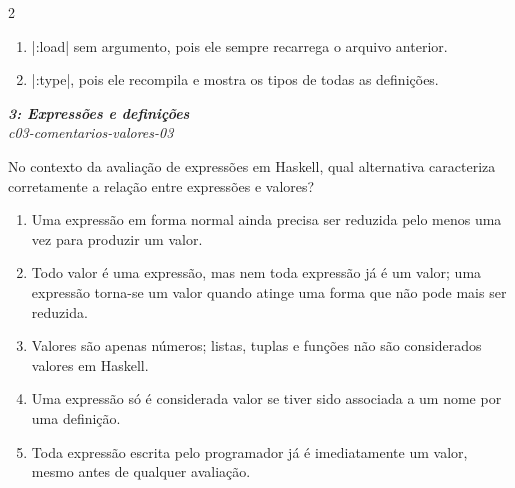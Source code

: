 \documentclass[a4paper,10pt,brazil]{article}
\begin{document}
\begin{multicols}{2}
\begin{enumerate}
  \item \haskellinline|:load| sem argumento, pois ele sempre recarrega o arquivo anterior.

  \item \haskellinline|:type|, pois ele recompila e mostra os tipos de todas as definições.


\end{enumerate}

\begin{flushright}
  \footnotesize
  \textit{\textbf{3: Expressões e definições}}\\
  \textit{c03-comentarios-valores-03}\\

\end{flushright}
No contexto da avaliação de expressões em Haskell, qual alternativa caracteriza corretamente a relação entre expressões e valores?

\begin{enumerate}
  \item Uma expressão em forma normal ainda precisa ser reduzida pelo menos uma vez para produzir um valor.

  \item Todo valor é uma expressão, mas nem toda expressão já é um valor; uma expressão torna-se um valor quando atinge uma forma que não pode mais ser reduzida.

  \item Valores são apenas números; listas, tuplas e funções não são considerados valores em Haskell.

  \item Uma expressão só é considerada valor se tiver sido associada a um nome por uma definição.

  \item Toda expressão escrita pelo programador já é imediatamente um valor, mesmo antes de qualquer avaliação.


\end{enumerate}


\end{multicols}
\end{document}
